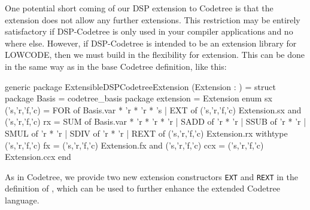 One potential short coming of our DSP extension to Codetree is that
the extension does not allow any further extensions.  This restriction
may be entirely satisfactory if DSP-Codetree is only used in your compiler
applications and no where else.  However, if DSP-Codetree is intended
to be an extension library for LOWCODE, then  we must build in the flexibility
for extension.  This can be done in the same way as in the base Codetree
definition, like this: 
\begin{SML}
generic package ExtensibleDSPCodetreeExtension
  (Extension : ) =
struct
   package Basis = codetree_basis
   package extension = Extension
   enum sx ('s,'r,'f,'c) = 
      FOR of Basis.var * 'r * 'r * 's
    | EXT of ('s,'r,'f,'c) Extension.sx 
   and ('s,'r,'f,'c) rx = 
      SUM of Basis.var * 'r * 'r * 'r
    | SADD of 'r * 'r
    | SSUB of 'r * 'r
    | SMUL of 'r * 'r
    | SDIV of 'r * 'r
    | REXT of ('s,'r,'f,'c) Extension.rx
   withtype
        ('s,'r,'f,'c) fx   = ('s,'r,'f,'c) Extension.fx
   and  ('s,'r,'f,'c) ccx  = ('s,'r,'f,'c) Extension.ccx
end
\end{SML}

As in Codetree, we provide two new extension 
constructors \verb|EXT| and \verb|REXT| in
the definition of , which  can 
be used to further enhance the extended Codetree language.
